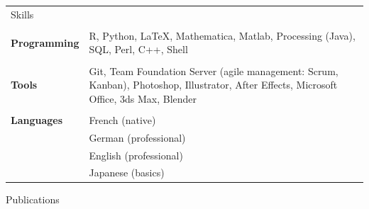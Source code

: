 \documentclass[a4paper,11pt,oneside]{article}
\begin{document}
\vspace{1em}

\noindent {\color{gray}\hrule} 
   
\vspace{1em}
   
\noindent \begin{longtable}{@{}p{3.1cm}@{}@{}p{13.9cm}@{}}
   \Large{Skills} & \\
   & \\
   \textbf{Programming} & R, Python, LaTeX, Mathematica, Matlab, Processing (Java), SQL, Perl, C++, Shell \\
   & \\   
   \textbf{Tools} & Git, Team Foundation Server (agile management: Scrum, Kanban), Photoshop, Illustrator, After Effects, Microsoft Office, 3ds Max, Blender \\
   & \\   
   \textbf{Languages} & French (native) \\
   & German (professional) \\
   & English (professional) \\
   & Japanese (basics)
\end{longtable}

\vspace{1em}

\noindent {\color{gray}\hrule} 
   
\vspace{2em}
   
\noindent \Large{Publications}

\vspace{0.5em}

\normalsize
\nocite{*}
\begingroup
\renewcommand{\section}[2]{}


\endgroup
\end{document}
